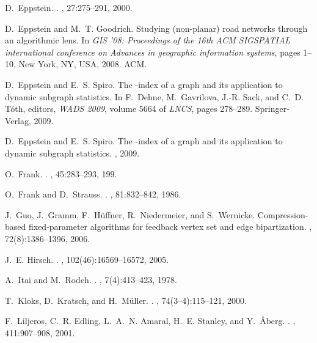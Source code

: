 \documentclass[11pt]{article}
\begin{document}
\begin{thebibliography}{10}
D.~Eppstein.
.
, 27:275{--}291, 2000.

D.~Eppstein and M.~T. Goodrich.
\newblock Studying (non-planar) road networks through an algorithmic lens.
\newblock In {\em GIS '08: Proceedings of the 16th ACM SIGSPATIAL international
  conference on Advances in geographic information systems}, pages 1--10, New
  York, NY, USA, 2008. ACM.

D.~Eppstein and E.~S. Spiro.
\newblock The -index of a graph and its application to dynamic subgraph
  statistics.
\newblock In F.~Dehne, M.~Gavrilova, J.-R. Sack, and C.~D. T{\'o}th, editors,
  {\em WADS 2009}, volume 5664 of {\em LNCS}, pages 278--289. Springer-Verlag,
  2009.

D.~Eppstein and E.~S. Spiro.
\newblock The -index of a graph and its application to dynamic subgraph
  statistics.
, 2009.

O.~Frank.
.
, 45:283{--}293, 199.

O.~Frank and D.~Strauss.
.
, 81:832{--}842, 1986.

J.~Guo, J.~Gramm, F.~H\"{u}ffner, R.~Niedermeier, and S.~Wernicke.
\newblock Compression-based fixed-parameter algorithms for feedback vertex set
  and edge bipartization.
, 72(8):1386--1396, 2006.

J.~E. Hirsch.
.
, 102(46):16569{--}16572,
  2005.

A.~Itai and M.~Rodeh.
.
, 7(4):413{--}423, 1978.

T.~Kloks, D.~Kratsch, and H.~M{\"u}ller.
.
, 74(3{--}4):115{--}121, 2000.

F.~Liljeros, C.~R. Edling, L.~A.~N. Amaral, H.~E. Stanley, and Y.~{\AA}berg.
.
, 411:907{--}908, 2001.


\end{thebibliography}
\end{document}

